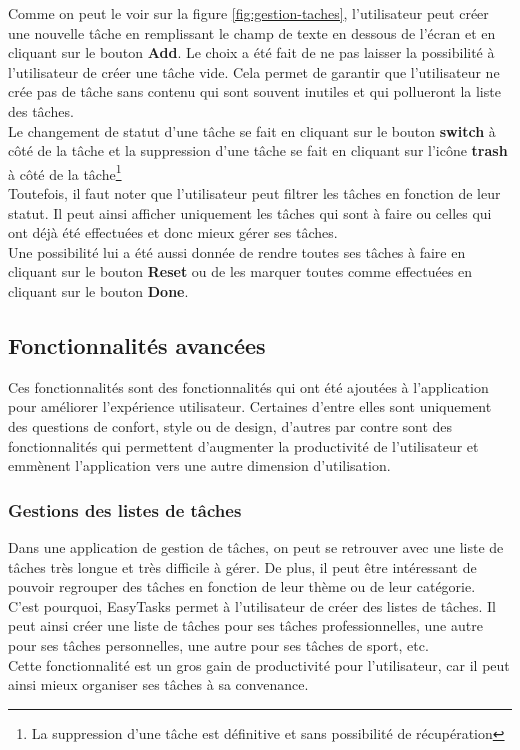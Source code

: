 \documentclass[12pt]{article}
\begin{document}
        Comme on peut le voir sur la figure \ref{fig:gestion-taches}, l'utilisateur peut créer une nouvelle tâche en
        remplissant le champ de texte en dessous de l'écran et en cliquant sur le bouton \textbf{Add}. Le choix
        a été fait de ne pas laisser la possibilité à l'utilisateur de créer une tâche vide. Cela permet de garantir
        que l'utilisateur ne crée pas de tâche sans contenu qui sont souvent inutiles et qui pollueront la liste des tâches.\\
        Le changement de statut d'une tâche se fait en cliquant sur le bouton \textbf{switch} à côté de la tâche et la suppression
        d'une tâche se fait en cliquant sur l'icône \textbf{trash} à côté de la tâche\footnote{La suppression d'une tâche est définitive et sans possibilité de récupération}\\

        Toutefois, il faut noter que l'utilisateur peut filtrer les tâches en fonction de leur statut. Il peut ainsi
        afficher uniquement les tâches qui sont à faire ou celles qui ont déjà été effectuées et donc mieux gérer ses tâches.\\
        Une possibilité lui a été aussi donnée de rendre toutes ses tâches à faire en cliquant sur le bouton \textbf{Reset} ou
        de les marquer toutes comme effectuées en cliquant sur le bouton \textbf{Done}.\\

        \subsection[Bonus]{Fonctionnalités avancées}\label{subsec:fonctionnalites-avancees}
        Ces fonctionnalités sont des fonctionnalités qui ont été ajoutées à l'application pour améliorer l'expérience utilisateur.
        Certaines d'entre elles sont uniquement des questions de confort, style ou de design, d'autres par contre sont
        des fonctionnalités qui permettent d'augmenter la productivité de l'utilisateur et emmènent l'application vers
        une autre dimension d'utilisation.\\

        \subsubsection{Gestions des listes de tâches}\label{subsubsec:gestion-des-listes-de-taches}
        Dans une application de gestion de tâches, on peut se retrouver avec une liste de tâches très longue et
        très difficile à gérer. De plus, il peut être intéressant de pouvoir regrouper des tâches en fonction de leur
        thème ou de leur catégorie.\\
        C'est pourquoi, EasyTasks permet à l'utilisateur de créer des listes de tâches. Il peut ainsi créer une liste
        de tâches pour ses tâches professionnelles, une autre pour ses tâches personnelles, une autre pour ses tâches
        de sport, etc.\\
        Cette fonctionnalité est un gros gain de productivité pour l'utilisateur, car il peut ainsi mieux organiser ses tâches
        à sa convenance.
\end{document}
